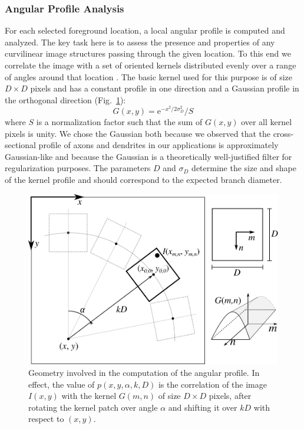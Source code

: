 \subsubsection{Angular Profile Analysis}
\label{subsubsec:angular-profile}
For each selected foreground location, a local angular profile is computed and analyzed. The key task here is to assess the presence and properties of any curvilinear image structures passing through the given location. To this end we correlate the image with a set of oriented kernels distributed evenly over a range of angles around that location \cite{radojevic2014fuzzy}. The basic kernel used for this purpose is of size $D\times D$ pixels and has a constant profile in one direction and a Gaussian profile in the orthogonal direction (Fig.~\ref{fig3}):
\begin{equation}
G(x,y)=\textrm{e}^{-x^2/2\sigma_{\!\!D}^{2}}/S
\label{eq:G}
\end{equation}
where $S$ is a normalization factor such that the sum of $G(x,y)$ over all kernel pixels is unity. We chose the Gaussian both because we observed that the cross-sectional profile of axons and dendrites in our applications is approximately Gaussian-like and because the Gaussian is a theoretically well-justified filter for regularization purposes. The parameters $D$ and $\sigma_{\!D}$ determine the size and shape of the kernel profile and should correspond to the expected branch diameter.

\begin{figure}[!t]
	\centering
	\includegraphics[width=0.5\columnwidth]{fig3}
	\caption{Geometry involved in the computation of the angular profile. In effect, the value of $p(x,y,\alpha,k,D)$ is the correlation of the image $I(x,y)$ with the kernel $G(m,n)$ of size $D\times D$ pixels, after rotating the kernel patch over angle $\alpha$ and shifting it over $kD$ with respect to $(x,y)$.}
	\label{fig3}
\end{figure}

